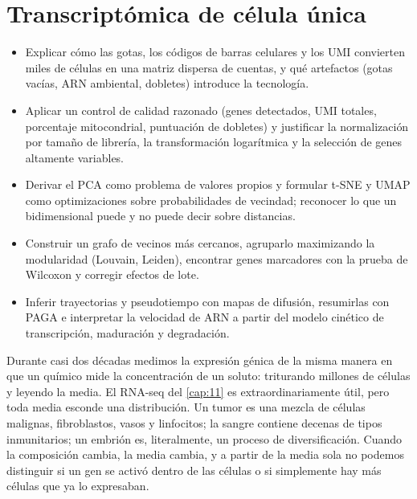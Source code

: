 \chapter{Transcriptómica de célula única}\label{cap:12}


\begin{objetivos}
\begin{itemize}
  \item Explicar cómo las gotas, los códigos de barras celulares y los UMI convierten miles de células en una matriz dispersa de cuentas, y qué artefactos (gotas vacías, ARN ambiental, dobletes) introduce la tecnología.
  \item Aplicar un control de calidad razonado (genes detectados, UMI totales, porcentaje mitocondrial, puntuación de dobletes) y justificar la normalización por tamaño de librería, la transformación logarítmica y la selección de genes altamente variables.
  \item Derivar el PCA como problema de valores propios y formular t-SNE y UMAP como optimizaciones sobre probabilidades de vecindad; reconocer lo que un  bidimensional puede y no puede decir sobre distancias.
  \item Construir un grafo de vecinos más cercanos, agruparlo maximizando la modularidad (Louvain, Leiden), encontrar genes marcadores con la prueba de Wilcoxon y corregir efectos de lote.
  \item Inferir trayectorias y pseudotiempo con mapas de difusión, resumirlas con PAGA e interpretar la velocidad de ARN a partir del modelo cinético de transcripción, maduración y degradación.
\end{itemize}
\end{objetivos}

Durante casi dos décadas medimos la expresión génica de la misma manera en que un químico mide la concentración de un soluto: triturando millones de células y leyendo la media. El RNA-seq  del \cref{cap:11} es extraordinariamente útil, pero toda media esconde una distribución. Un tumor es una mezcla de células malignas, fibroblastos, vasos y linfocitos; la sangre contiene decenas de tipos inmunitarios; un embrión es, literalmente, un proceso de diversificación. Cuando la composición cambia, la media cambia, y a partir de la media sola no podemos distinguir si un gen se activó dentro de las células o si simplemente hay más células que ya lo expresaban.

